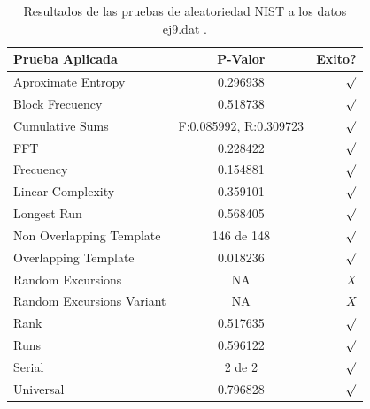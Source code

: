 \documentclass[10pt]{IEEEtran}
\begin{document}
\begin{table}[H]
\caption{Resultados de las pruebas de aleatoriedad NIST a los datos ej9.dat .}
\label{caso9}
\begin{center}
\begin{small}
\begin{tabular}{|l|c|r|}
\hline

Prueba Aplicada &  P-Valor & Exito? \\
\hline

Aproximate Entropy    &   0.296938  & $\surd$ \\

Block Frecuency  &  0.518738 &   $\surd$   \\

Cumulative Sums    &   F:0.085992, R:0.309723 & $\surd$ \\

FFT    &   0.228422 &  $\surd$     \\

Frecuency     &  0.154881 &  $\surd$   \\

Linear Complexity      & 0.359101 & $\surd$ \\

Longest Run      &  0.568405 &    $\surd$      \\

Non Overlapping Template      & 146 de 148    &     $\surd$          \\

Overlapping Template      &  0.018236  &      $\surd$      \\

Random Excursions      & NA  &    $X$      \\

Random Excursions Variant & NA &     $X$    \\

Rank & 0.517635  &      $\surd$      \\

Runs &   0.596122  &     $\surd$        \\

Serial &     2 de 2    &     $\surd$        \\

Universal &   0.796828 &   $\surd$            \\

\hline

\end{tabular}
\end{small}
\end{center}
\end{table}
\end{document}
